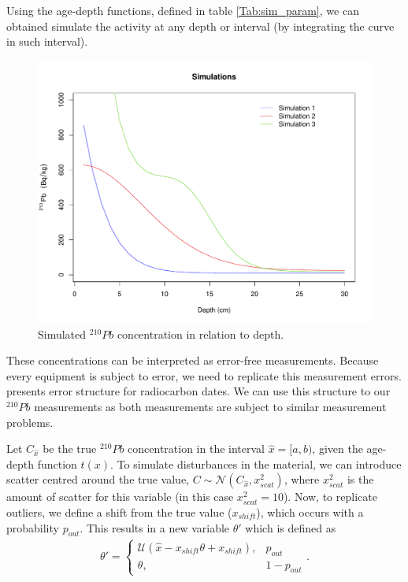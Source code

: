 \documentclass [11pt] {article}
\begin{document}
	Using the age-depth functions, defined in table \ref{Tab:sim_param}, we can obtained simulate the activity at any depth or interval (by integrating the curve in such interval). 
\begin{figure}
 \centering
  \includegraphics[width=\linewidth]{Simulations_t_act.pdf}
  \caption{Simulated $^{210}Pb$ concentration in relation to depth.}
  \label{fig:true_210}
\end{figure}

	These concentrations can be interpreted as error-free measurements. Because every equipment is subject to error, we need to replicate this measurement errors. \citep{Blaauw2018} presents error structure for radiocarbon dates. We can use this structure to our $^{210}Pb$ measurements as both measurements are subject to similar measurement problems. 

	Let $C_{\hat{x}}$ be the true  $^{210}Pb$ concentration in the interval $\hat{x}=[a,b)$, given the age-depth function $t(x)$. To simulate disturbances in the material, we can introduce scatter centred around the true value, $C\sim \mathcal{N}\left(C_{\hat{x}},x^2_{scat}\right)$, where $x^2_{scat}$ is the amount of scatter for this variable (in this case $x^2_{scat}=10$). Now, to replicate outliers, we define a shift from the true value ($x_{shift}$), which occurs with a probability $p_{out}$. This results in a new variable $\theta'$ which is defined as
\begin{align}
	\theta' = \begin{cases}
			\mathcal{U}(\hat{x} - x_{shift}\theta + x_{shift}), &  p_{out} \\
			\theta, & 1-p_{out}
		\end{cases}.
\end{align}
\end{document}
